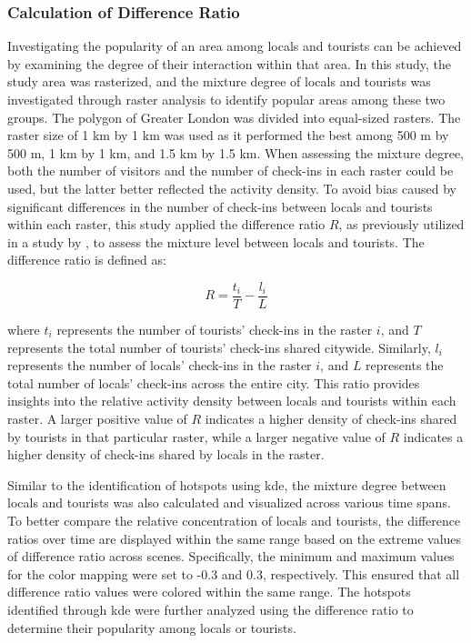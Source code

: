 \documentclass{article}
\theoremstyle{remark}
\begin{document}
\subsubsection{Calculation of Difference Ratio}
Investigating the popularity of an area among locals and tourists can be achieved by examining the degree of their interaction within that area. In this study, the study area was rasterized, and the mixture degree of locals and tourists was investigated through raster analysis to identify popular areas among these two groups. The polygon of Greater London was divided into equal-sized rasters. The raster size of 1 km by 1 km was used as it performed the best among 500 m by 500 m, 1 km by 1 km, and 1.5 km by 1.5 km. When assessing the mixture degree, both the number of visitors and the number of check-ins in each raster could be used, but the latter better reflected the activity density. To avoid bias caused by significant differences in the number of check-ins between locals and tourists within each raster, this study applied the difference ratio $R$, as previously utilized in a study by \cite{li_analyzing_2018}, to assess the mixture level between locals and tourists. The difference ratio is defined as:

\begin{equation} \label{eq:diff_ratio}
    R = \frac{t_{i}}{T}-\frac{l_{i}}{L}
\end{equation}

where $t_{i}$ represents the number of tourists' check-ins in the raster $i$, and $T$ represents the total number of tourists' check-ins shared citywide. Similarly, $l_{i}$ represents the number of locals' check-ins in the raster $i$, and $L$ represents the total number of locals' check-ins across the entire city. This ratio provides insights into the relative activity density between locals and tourists within each raster. A larger positive value of $R$ indicates a higher density of check-ins shared by tourists in that particular raster, while a larger negative value of \(R\) indicates a higher density of check-ins shared by locals in the raster.

Similar to the identification of hotspots using \acrshort{kde}, the mixture degree between locals and tourists was also calculated and visualized across various time spans. To better compare the relative concentration of locals and tourists, the difference ratios over time are displayed within the same range based on the extreme values of difference ratio across scenes. Specifically, the minimum and maximum values for the color mapping were set to -0.3 and 0.3, respectively. This ensured that all difference ratio values were colored within the same range. The hotspots identified through \acrshort{kde} were further analyzed using the difference ratio to determine their popularity among locals or tourists.
\end{document}
